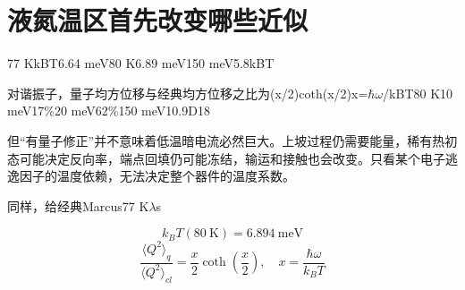 \section{{\cjkfont 液氮温区首先改变哪些近似}\allowbreak{}}\label{sec:40}
77 K\allowbreak{}kBT\allowbreak{}6.64 meV\allowbreak{}80 K\allowbreak{}6.89 meV\allowbreak{}150 meV\allowbreak{}5.8kBT\allowbreak{}
\par
{\cjkfont 对谐振子，量子均方位移与经典均方位移之比为}\allowbreak{}(x/2)coth(x/2)\allowbreak{}x=\allowbreak{}\ensuremath{\hbar}\ensuremath{\omega}/kBT\allowbreak{}80 K\allowbreak{}10 meV\allowbreak{}17\%\allowbreak{}20 meV\allowbreak{}62\%\allowbreak{}150 meV\allowbreak{}10.9\allowbreak{}D18\allowbreak{}
\par
{\cjkfont 但“有量子修正”并不意味着低温暗电流必然巨大。上坡过程仍需要能量，稀有热初态可能决定反向率，端点回填仍可能冻结，输运和接触也会改变。只看某个电子逃逸因子的温度依赖，无法决定整个器件的温度系数。}\allowbreak{}
\par
{\cjkfont 同样，给经典}\allowbreak{}Marcus\allowbreak{}77 K\allowbreak{}\ensuremath{\lambda}s\allowbreak{}
\par
\begin{equation}
k_BT(80\ \mathrm{K})=6.894\ \mathrm{meV}
\label{eq:45}\end{equation}
\begin{equation}
\frac{\langle Q^2\rangle_q}{\langle Q^2\rangle_{cl}}=\frac{x}{2}\coth\!\left(\frac{x}{2}\right),\quad x=\frac{\hbar\omega}{k_BT}
\label{eq:46}\end{equation}
